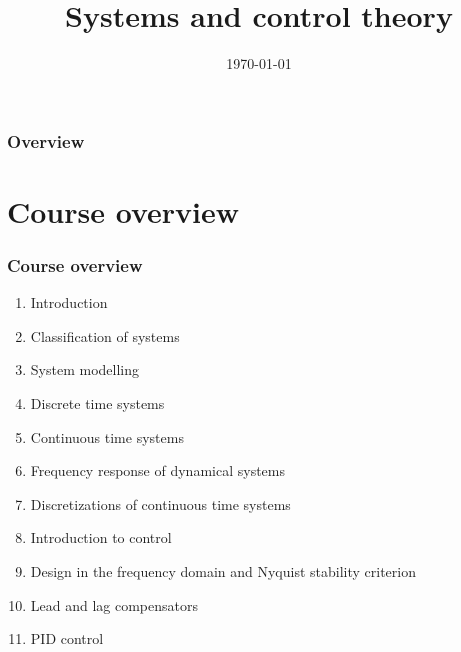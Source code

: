 \documentclass{beamer}
\title[Introduction]{Systems and control theory}
\author{} %
\institute[KU Leuven] %
{
Katholieke Universiteit Leuven \\ %
\medskip
\textit{} %
}
\date{\today}
\begin{document}
\begin{frame}
\titlepage
\end{frame}

\begin{frame}
\frametitle{Overview} 
\tableofcontents
\end{frame}


\section{Course overview} 

\begin{frame}
\frametitle{Course overview}
\begin{enumerate}
\item Introduction
\item Classification of systems
\item System modelling
\item Discrete time systems
\item Continuous time systems
\item Frequency response of dynamical systems
\item Discretizations of continuous time systems
\item Introduction to control
\item Design in the frequency domain and Nyquist stability criterion
\item Lead and lag compensators
\item PID control
\end{enumerate}
\end{frame}



\end{document}
